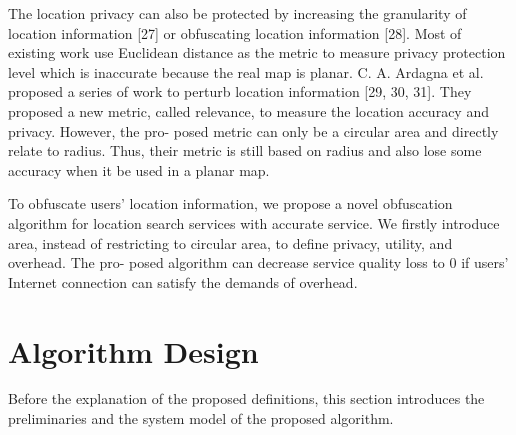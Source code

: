 \documentclass[a4paper,fleqn]{cas-dc}
\begin{document}
The location privacy can also be protected by increasing the granularity of location information [27] or obfuscating location information [28]. Most of existing work use Euclidean distance as the metric to measure privacy protection level which is inaccurate because the real map is planar. C. A. Ardagna et al. proposed a series of work to perturb location information [29, 30, 31]. They proposed a new metric, called relevance, to measure the location accuracy and privacy. However, the pro- posed metric can only be a circular area and directly relate to radius. Thus, their metric is still based on radius and also lose some accuracy when it be used in a planar map.

To obfuscate users’ location information, we propose a novel obfuscation algorithm for location search services with accurate service. We firstly introduce area, instead of restricting to circular area, to define privacy, utility, and overhead. The pro- posed algorithm can decrease service quality loss to 0 if users’ Internet connection can satisfy the demands of overhead.

 
\section{Algorithm Design}
Before the explanation of the proposed definitions, this section introduces the preliminaries and the system model of the proposed algorithm.
\end{document}
